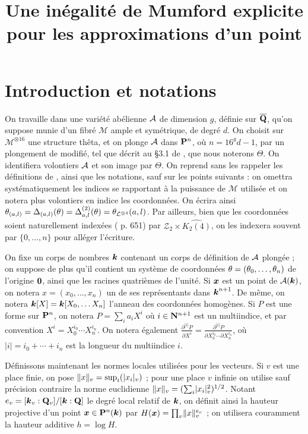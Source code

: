 \documentclass{mpg-preth}
\title{Une inégalité de Mumford explicite\\
  pour les approximations d'un point}
\begin{document}
\maketitle

\section*{Introduction et notations}

On travaille dans une variété abélienne $\mathcal{A}$ de dimension $g$, définie sur
$\overline{{\mathbf{Q}}}$, qu'on suppose munie d'un fibré $\mathcal{M}$ ample et symétrique, de
degré $d$. On choisit sur $\mathcal{M}^{\otimes 16}$ une structure thêta, et
on plonge $\mathcal{A}$ dans ${\mathbf{P}}^n$, où $n=16^g d - 1$, par un plongement de
 modifié, tel que décrit au §3.1 de \cite{daphimhva2}, que nous
noterons $\Theta$. On identifiera volontiers $\mathcal{A}$ et son image par $\Theta$.
On reprend sans les rappeler les définitions de , ainsi que les
notations, sauf sur les points suivants : on omettra systématiquement les
indices se rapportant à la puissance de $\mathcal{M}$ utilisée et on notera
plus volontiers en indice les coordonnées. On écrira ainsi $\theta_{(a, l)} =
\Delta_{(a, l)}(\theta)  = \Delta_{a, l}^{(2)}(\theta) =
\theta_{\mathcal{L}^{\otimes 4}}(a, l)$. Par ailleurs, bien que les coordonnées
soient naturellement indexées ( p. 651) par $\mathcal{Z}_2 \times
\widehat{K_2(4)}$, on les indexera souvent par $\{0, \dots, n\}$ pour alléger
l'écriture.

On fixe un corps de nombres $\boldsymbol{k}$ contenant un corps de définition de $\mathcal{A}$
plongée ; on suppose de plus qu'il contient un système de coordonnées $\theta =
(\theta_0,\dots,\theta_n)$ de l'origine ${\boldsymbol{0}}$, ainsi que les racines quatrièmes de
l'unité. Si ${\boldsymbol{x}}$ est un point de $\mathcal{A}(\boldsymbol{k})$, on notera $x = (x_0, \dots,
x_n)$ un de ses représentants dans $\boldsymbol{k}^{n+1}$. De même, on notera $\boldsymbol{k}[X] =
\boldsymbol{k}[X_0, \dots X_n]$ l'anneau des coordonnées homogènes. Si $P$ est une forme
sur ${\mathbf{P}}^n$, on notera $P= \sum_i a_i X^i$ où $i \in {\mathbf{N}}^{n+1}$ est un
multiindice, et par convention $X^i = X_0^{i_0}\cdots X_n^{i_n}$. On notera
également $\frac{\partial^{|i|} P}{\partial X^i} = \frac{\partial^{|i|}
  P}{\partial X_0^{i_0}\cdots \partial X_n^{i_n}}$, où $|i| = i_0 + \cdots +
i_n$ est la longueur du multiindice $i$.

Définissons maintenant les normes locales utilisées pour les vecteurs. Si $v$
est une place finie, on pose $\lVert x\rVert_{v} = \sup_i(\lvert x_i\rvert_{v})$ ; pour une place $v$
infinie on utilise sauf précision contraire la norme euclidienne $\lVert x\rVert_{v} = (
\sum_i \lvert x_i\rvert_{v}^2 )^{1/2}$. Notant $e_v = [\boldsymbol{k}_v : {\mathbf{Q}}_v]/[\boldsymbol{k} : {\mathbf{Q}}]$ le degré
local relatif de $\boldsymbol{k}$, on définit ainsi la hauteur projective d'un point
${\boldsymbol{x}} \in {\mathbf{P}}^n(\boldsymbol{k})$ par $H({\boldsymbol{x}}) = \prod_v \lVert x\rVert_{v}^{e_v}$ ; on utilisera
couramment la hauteur additive $h = \log H$.
\end{document}
